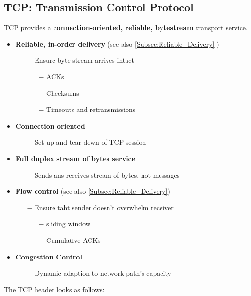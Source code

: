 \documentclass[a4paper, fontsize=8pt, landscape, DIV=1]{scrartcl}
\begin{document}
\begin{multicols*}{4}
		\subsection{TCP: Transmission Control Protocol}
		TCP provides a \textbf{connection-oriented, reliable, bytestream} transport service.
		\begin{itemize}[noitemsep]
			\item \textbf{Reliable, in-order delivery} (see also \ref{Subsec:Reliable_Delivery} )
			\begin{itemize}
				\item[$-$] Ensure byte stream arrives intact
				\begin{itemize}
					\item[$-$] ACKs
					\item[$-$] Checksums
					\item[$-$] Timeouts and retransmissions	
				\end{itemize}
			\end{itemize}
			\item \textbf{Connection oriented}
			\begin{itemize}
				\item[$-$] Set-up and tear-down of TCP session
			\end{itemize}
			\item \textbf{Full duplex stream of bytes service}
			\begin{itemize}
				\item[$-$] Sends ans receives stream of bytes, not messages
			\end{itemize}
			\item \textbf{Flow control} (see also \ref{Subsec:Reliable_Delivery})
			\begin{itemize}
				\item[$-$] Ensure taht sender doesn't overwhelm receiver
				\begin{itemize}
					\item[$-$] sliding window
					\item[$-$] Cumulative ACKs
				\end{itemize}
			\end{itemize}
			\item \textbf{Congestion Control}
			\begin{itemize}
				\item[$-$] Dynamic adaption to network path's capacity
			\end{itemize}
		\end{itemize}
		The TCP header looks as follows: \\

\end{multicols*}
\end{document}
